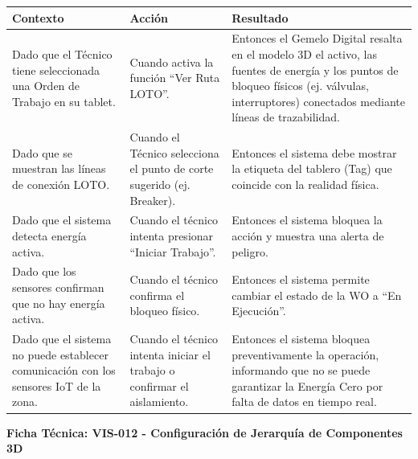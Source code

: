\footnotesize\begin{longtable}{|p{0.28\textwidth}|p{0.32\textwidth}|p{0.34\textwidth}|}\hline
\textbf{Contexto} & \textbf{Acción} & \textbf{Resultado} \\ \hline
\parbox[t]{\linewidth}{Dado que el Técnico tiene seleccionada una Orden de Trabajo en su tablet.} & \parbox[t]{\linewidth}{Cuando activa la función ``Ver Ruta LOTO''.} & \parbox[t]{\linewidth}{Entonces el Gemelo Digital resalta en el modelo 3D el activo, las fuentes de energía y los puntos de bloqueo físicos (ej. válvulas, interruptores) conectados mediante líneas de trazabilidad.} \\ \hline
\parbox[t]{\linewidth}{Dado que se muestran las líneas de conexión LOTO.} & \parbox[t]{\linewidth}{Cuando el Técnico selecciona el punto de corte sugerido (ej. Breaker).} & \parbox[t]{\linewidth}{Entonces el sistema debe mostrar la etiqueta del tablero (Tag) que coincide con la realidad física.} \\ \hline
\parbox[t]{\linewidth}{Dado que el sistema detecta energía activa.} & \parbox[t]{\linewidth}{Cuando el técnico intenta presionar ``Iniciar Trabajo''.} & \parbox[t]{\linewidth}{Entonces el sistema bloquea la acción y muestra una alerta de peligro.} \\ \hline
\parbox[t]{\linewidth}{Dado que los sensores confirman que no hay energía activa.} & \parbox[t]{\linewidth}{Cuando el técnico confirma el bloqueo físico.} & \parbox[t]{\linewidth}{Entonces el sistema permite cambiar el estado de la WO a ``En Ejecución''.} \\ \hline
\parbox[t]{\linewidth}{Dado que el sistema no puede establecer comunicación con los sensores IoT de la zona.} & \parbox[t]{\linewidth}{Cuando el técnico intenta iniciar el trabajo o confirmar el aislamiento.} & \parbox[t]{\linewidth}{Entonces el sistema bloquea preventivamente la operación, informando que no se puede garantizar la Energía Cero por falta de datos en tiempo real.} \\ \hline
\end{longtable}\normalsize
\vspace{1em}
\noindent\textbf{Ficha Técnica: VIS-012 - Configuración de Jerarquía de Componentes 3D}
\footnotesize\setlength{\tabcolsep}{4pt}\renewcommand{\arraystretch}{1.2}
